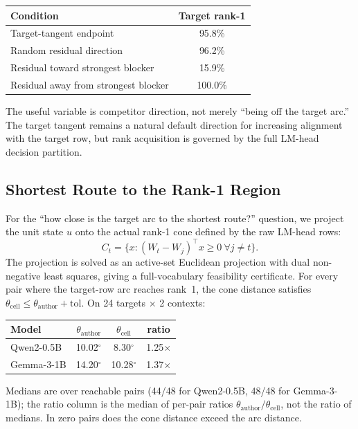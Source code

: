 \documentclass{article}
\begin{document}
\begin{center}
\begin{tabular}{lc}
\toprule
Condition & Target rank-1 \\
\midrule
Target-tangent endpoint & 95.8\% \\
Random residual direction & 96.2\% \\
Residual toward strongest blocker & 15.9\% \\
Residual away from strongest blocker & 100.0\% \\
\bottomrule
\end{tabular}
\end{center}

The useful variable is competitor direction, not merely ``being off the target
arc.'' The target tangent remains a natural default direction for increasing
alignment with the target row, but rank acquisition is governed by the full
LM-head decision partition.

\subsection{Shortest Route to the Rank-1 Region}

For the ``how close is the target arc to the shortest route?'' question, we
project the unit state $u$ onto the actual rank-1 cone defined by the raw
LM-head rows:
\[
C_t = \{x : (W_t - W_j)^\top x \geq 0\ \forall j \neq t\}.
\]
The projection is solved as an active-set Euclidean projection with dual
non-negative least squares, giving a full-vocabulary feasibility certificate.
For every pair where the target-row arc reaches rank~1, the cone distance
satisfies $\theta_{\mathrm{cell}} \leq \theta_{\mathrm{author}} + \mathrm{tol}$.
On 24 targets $\times$ 2 contexts:

\begin{center}
\begin{tabular}{lccc}
\toprule
Model & $\theta_{\mathrm{author}}$ & $\theta_{\mathrm{cell}}$ & ratio \\
\midrule
Qwen2-0.5B & 10.02$^\circ$ & 8.30$^\circ$ & 1.25$\times$ \\
Gemma-3-1B & 14.20$^\circ$ & 10.28$^\circ$ & 1.37$\times$ \\
\bottomrule
\end{tabular}
\end{center}

Medians are over reachable pairs (44/48 for Qwen2-0.5B, 48/48 for
Gemma-3-1B); the ratio column is the median of per-pair ratios
$\theta_{\mathrm{author}}/\theta_{\mathrm{cell}}$, not the ratio of medians.
In zero pairs does the cone distance exceed the arc distance.
\end{document}

